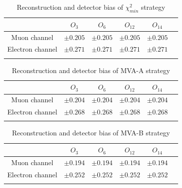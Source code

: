 		\begin{center}
		\begin{longtable}[H]{ c c c c c c }
		\caption{Reconstruction and detector bias of $\chi^2_{min}$ strategy}\\
		\hline
		[\%] & $O_{3}$ & $O_{6}$ & $O_{12}$ & $O_{14}$ \\ 
		\hline{}
		Muon channel & $\pm0.205$ & $\pm0.205$ & $\pm0.205$ & $\pm0.205$ \\
		Electron channel & $\pm0.271$ & $\pm0.271$ & $\pm0.271$ & $\pm0.271$ \\
		\hline
		\label{AsymBias:tb:chi2_DetBias}
		\end{longtable}
		\end{center}

		\begin{center}
		\begin{longtable}[H]{ c c c c c c }
		\caption{Reconstruction and detector bias of MVA-A strategy}\\
		\hline
		[\%] & $O_{3}$ & $O_{6}$ & $O_{12}$ & $O_{14}$ \\ 
		\hline{}
		Muon channel & $\pm0.204$ & $\pm0.204$ & $\pm0.204$ & $\pm0.204$ \\
		Electron channel & $\pm0.268$ & $\pm0.268$ & $\pm0.268$ & $\pm0.268$ \\
		\hline
		\label{AsymBias:tb:a05_Mlbcut_DetBias}
		\end{longtable}
		\end{center}

		\begin{center}
		\begin{longtable}[H]{ c c c c c c }
		\caption{Reconstruction and detector bias of MVA-B strategy}\\
		\hline
		[\%] & $O_{3}$ & $O_{6}$ & $O_{12}$ & $O_{14}$ \\ 
		\hline{}
		Muon channel & $\pm0.194$ & $\pm0.194$ & $\pm0.194$ & $\pm0.194$ \\
		Electron channel & $\pm0.252$ & $\pm0.252$ & $\pm0.252$ & $\pm0.252$ \\
		\hline
		\label{AsymBias:tb:a05_noMlbcut_DetBias}
		\end{longtable}
		\end{center}

\FloatBarrier
